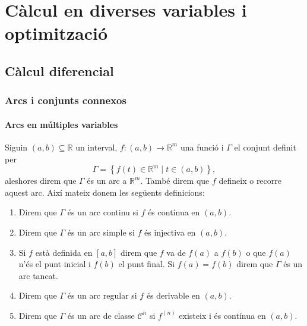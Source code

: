 \documentclass[../Apunts.tex]{subfiles}
\begin{document}
\part{Càlcul en diverses variables i optimització}
\chapter{Càlcul diferencial}
	\section{Arcs i conjunts connexos}
	\subsection{Arcs en múltiples variables}
	\begin{definition}
		\label{def:arc}
		\label{def:arc continu}
		\label{def:arc simple}
		\label{def:arc tancat}
		\label{def:arc regular}
		\label{def:arc de classe de diferenciabilitat n}
		Siguin \((a,b)\subseteq\mathbb{R}\) un interval, \(f\colon(a,b)\to\mathbb{R}^{m}\) una funció i \(\Gamma\) el conjunt definit per
		\[\Gamma=\left\{f(t)\in\mathbb{R}^{m}\mid t\in(a,b)\right\},\]
		aleshores direm que \(\Gamma\) és un arc a \(\mathbb{R}^{m}\). També direm que \(f\) defineix o recorre aquest arc.
		Així mateix donem les següents definicions:
		\begin{enumerate}
			\item Direm que \(\Gamma\) és un arc continu si \(f\) és contínua en \((a,b)\).
			\item Direm que \(\Gamma\) és un arc simple si \(f\) és injectiva en \((a,b)\).
			\item Si \(f\) està definida en \([a,b]\) direm que \(f\) va de \(f(a)\) a \(f(b)\) o que \(f(a)\) n'és el punt inicial i \(f(b)\) el punt final. Si \(f(a)=f(b)\) direm que \(\Gamma\) és un arc tancat.
			\item Direm que \(\Gamma\) és un arc regular si \(f\) és derivable en \((a,b)\).
			\item Direm que \(\Gamma\) és un arc de classe \(\mathcal{C}^{n}\) si \(f^{(n)}\) existeix i és contínua en \((a,b)\).
		\end{enumerate}
	\end{definition}
\end{document}
